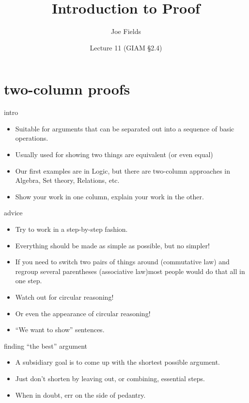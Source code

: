 \documentclass[landscape]{beamer}
\author{Joe Fields}
\title{Introduction to Proof}
\date{Lecture 11 (GIAM \S 2.4)}
\institute[SCSU]{ {\tt fieldsj1@southernct.edu} }
\begin{document}
\begin{frame}[plain]
  \titlepage
\end{frame}


\section{two-column proofs}

\begin{frame}{intro}
\begin{itemize}
\item Suitable for arguments that can be separated out into a sequence of basic operations.\pause
\item Usually used for showing two things are equivalent (or even equal) \pause
\item Our first examples are in Logic, \pause but there are two-column approaches in Algebra, Set theory, Relations, etc. \pause
\item Show your work in one column, explain your work in the other.
\end{itemize}
\end{frame}

\begin{frame}{advice}
\begin{itemize}
\item Try to work in a step-by-step fashion. \pause
\item Everything should be made as simple as possible, but no simpler!\pause
\item If you need to switch two pairs of things around (commutative law) and regroup several parentheses (associative law)\pause \newline most people would do that all in one step. \pause
\item Watch out for circular reasoning! \pause
\item Or even the appearance of circular reasoning! \pause
\item ``We want to show'' sentences.
\end{itemize}
\end{frame}

\begin{frame}{finding ``the best'' argument}
\begin{itemize}
\item A subsidiary goal is to come up with the shortest possible argument. \pause
\item Just don't shorten by leaving out, or combining, essential steps. \pause
\item When in doubt, err on the side of pedantry.
\end{itemize}
\end{frame}
\end{document}
